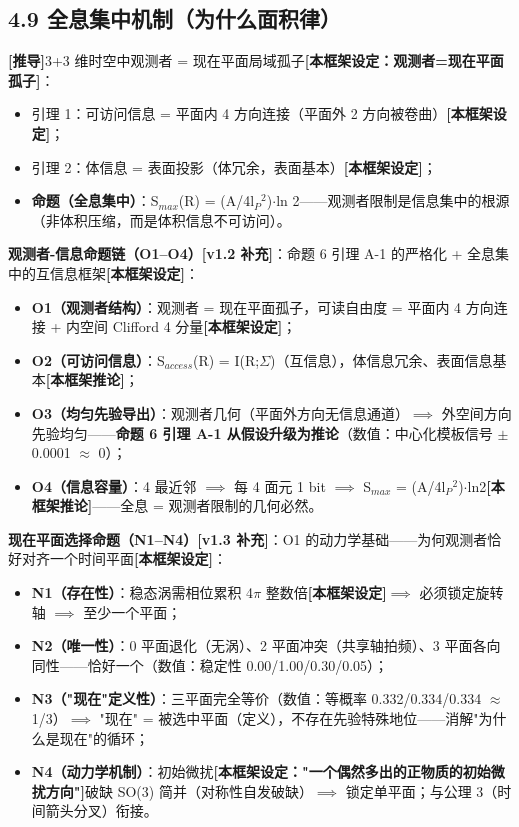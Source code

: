 \documentclass[12pt]{article}
\newcommand{\mtag}[1]{\textbf{[#1]}}
\newcommand{\up}[1]{\ensuremath{^{#1}}}
\newcommand{\down}[1]{\ensuremath{_{#1}}}
\begin{document}
\subsection{4.9 全息集中机制（为什么面积律）}

\mtag{推导}3+3 维时空中观测者 = 现在平面局域孤子\mtag{本框架设定：观测者=现在平面孤子}：
\begin{itemize}
\item 引理 1：可访问信息 = 平面内 4 方向连接（平面外 2 方向被卷曲）\mtag{本框架设定}；
\item 引理 2：体信息 = 表面投影（体冗余，表面基本）\mtag{本框架设定}；
\item \textbf{命题（全息集中）}：S\down{max}(R) = (A/4l\down{P}\up{2})\ensuremath{\cdot}ln 2------观测者限制是信息集中的根源（非体积压缩，而是体积信息不可访问）。
\end{itemize}

\textbf{观测者-信息命题链（O1--O4）\mtag{v1.2 补充}}：命题 6 引理 A-1 的严格化 + 全息集中的互信息框架\mtag{本框架设定}：
\begin{itemize}
\item \textbf{O1（观测者结构）}：观测者 = 现在平面孤子，可读自由度 = 平面内 4 方向连接 + 内空间 Clifford 4 分量\mtag{本框架设定}；
\item \textbf{O2（可访问信息）}：S\down{access}(R) = I(R;\ensuremath{\Sigma})（互信息），体信息冗余、表面信息基本\mtag{本框架推论}；
\item \textbf{O3（均匀先验导出）}：观测者几何（平面外方向无信息通道）\ensuremath{\implies} 外空间方向先验均匀------\textbf{命题 6 引理 A-1 从假设升级为推论}（数值：中心化模板信号 \ensuremath{\pm}0.0001 \ensuremath{\approx} 0）；
\item \textbf{O4（信息容量）}：4 最近邻 \ensuremath{\implies} 每 4 面元 1 bit \ensuremath{\implies} S\down{max} = (A/4l\down{P}\up{2})\ensuremath{\cdot}ln2\mtag{本框架推论}------全息 = 观测者限制的几何必然。
\end{itemize}

\textbf{现在平面选择命题（N1--N4）\mtag{v1.3 补充}}：O1 的动力学基础------为何观测者恰好对齐一个时间平面\mtag{本框架设定}：
\begin{itemize}
\item \textbf{N1（存在性）}：稳态涡需相位累积 4\ensuremath{\pi} 整数倍\mtag{本框架设定}\ensuremath{\implies} 必须锁定旋转轴 \ensuremath{\implies} 至少一个平面；
\item \textbf{N2（唯一性）}：0 平面退化（无涡）、2 平面冲突（共享轴拍频）、3 平面各向同性------恰好一个（数值：稳定性 0.00/1.00/0.30/0.05）；
\item \textbf{N3（"现在"定义性）}：三平面完全等价（数值：等概率 0.332/0.334/0.334 \ensuremath{\approx} 1/3）\ensuremath{\implies} "现在" = 被选中平面（定义），不存在先验特殊地位------消解"为什么是现在"的循环；
\item \textbf{N4（动力学机制）}：初始微扰\mtag{本框架设定："一个偶然多出的正物质的初始微扰方向"}破缺 SO(3) 简并（对称性自发破缺）\ensuremath{\implies} 锁定单平面；与公理 3（时间箭头分叉）衔接。
\end{itemize}
\end{document}

